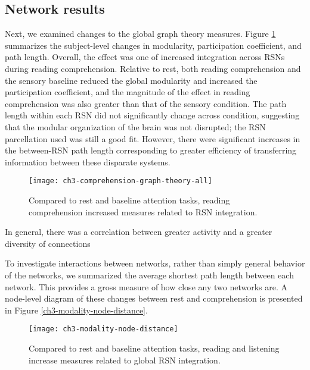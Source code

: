 \subsection{Network results}

Next, we examined changes to the global graph theory measures. Figure \ref{fig:ch3-comprehension-graph-theory-all} summarizes the subject-level changes in modularity, participation coefficient, and path length. Overall, the effect was one of increased integration across RSNs during reading comprehension. Relative to rest, both reading comprehension and the sensory baseline reduced the global modularity and increased the participation coefficient, and the magnitude of the effect in reading comprehension was also greater than that of the sensory condition. The path length within each RSN did not significantly change across condition, suggesting that the modular organization of the brain was not disrupted; the RSN parcellation used was still a good fit. However, there were significant increases in the between-RSN path length corresponding to greater efficiency of transferring information between these disparate systems.

\begin{figure}[t]
	\centering
	\texttt{[image: ch3-comprehension-graph-theory-all]}
    \caption[Reading induces more integrated global network architecture.]{Compared to rest and baseline attention tasks, reading comprehension increased measures related to RSN integration.}
	\label{fig:ch3-comprehension-graph-theory-all}
\end{figure}

In general, there was a correlation between greater activity and a greater diversity of connections


To investigate interactions between networks, rather than simply general behavior of the networks, we summarized the average shortest path length between each network. This provides a gross measure of how close any two networks are. A node-level diagram of these changes between rest and comprehension is presented in Figure \ref{ch3-modality-node-distance}. 

\begin{figure}[t]
	\centering
	\texttt{[image: ch3-modality-node-distance]}
    \caption[Language induces more integrated global network architecture.]{Compared to rest and baseline attention tasks, reading and listening increase measures related to global RSN integration.}
	\label{fig:ch3-modality-node-distance}
\end{figure}

